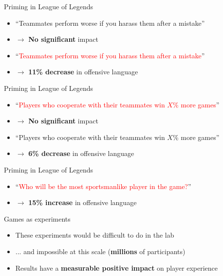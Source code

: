 {

\begin{frame}{Priming in League of Legends}
	\begin{itemize}
		\pause\item ``Teammates perform worse if you harass them after a mistake''
		\pause\item $\to$ \textbf{No significant} impact
		\pause\item ``\textcolor{red}{Teammates perform worse if you harass them after a mistake}''
		\pause\item $\to$ \textbf{11\% decrease} in offensive language
	\end{itemize}
\end{frame}

\begin{frame}{Priming in League of Legends}
	\begin{itemize}
		\pause\item ``\textcolor{red}{Players who cooperate with their teammates win $X$\% more games}''
		\pause\item $\to$ \textbf{No significant} impact
		\pause\item ``\textcolor{blue!50}{Players who cooperate with their teammates win $X$\% more games}''
		\pause\item $\to$ \textbf{6\% decrease} in offensive language
	\end{itemize}
\end{frame}

\begin{frame}{Priming in League of Legends}
	\begin{itemize}
		\pause\item ``\textcolor{red}{Who will be the most sportsmanlike player in the game?}''
		\pause\item $\to$ \textbf{15\% increase} in offensive language
	\end{itemize}
\end{frame}

} %

\begin{frame}{Games as experiments}
	\begin{itemize}
		\pause\item These experiments would be difficult to do in the lab
		\pause\item ... and impossible at this scale (\textbf{millions} of participants)
		\pause\item Results have a \textbf{measurable positive impact} on player experience
	\end{itemize}
\end{frame}

